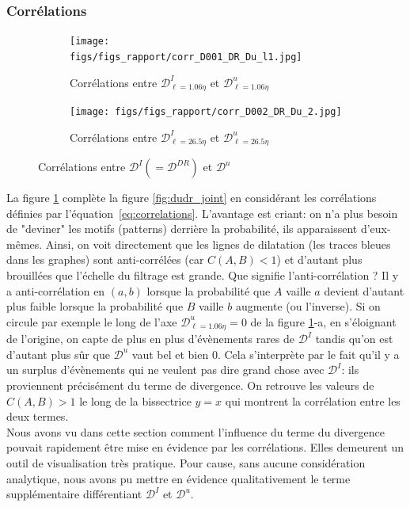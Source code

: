 \documentclass[13pt, a4paper]{extarticle}
\begin{document}
\subsubsection{Corrélations}
\begin{figure}[H]
  \centering
  \begin{subfigure}[b]{0.48\linewidth}
  \centering
  \texttt{[image: figs/figs\_rapport/corr\_D001\_DR\_Du\_l1.jpg]}
  \caption{Corrélations entre $\mathscr{D}^I_{\ell=1.06\eta}$ et $\mathscr{D}^u_{\ell=1.06\eta}$}
  \end{subfigure}
  \begin{subfigure}[b]{0.48\linewidth}
    \centering
    \texttt{[image: figs/figs\_rapport/corr\_D002\_DR\_Du\_2.jpg]}
    \caption{Corrélations entre $\mathscr{D}^I_{\ell=26.5\eta}$ et $\mathscr{D}^u_{\ell=26.5\eta}$}
    \end{subfigure}
  \caption{Corrélations entre $\mathscr{D}^I (=\mathscr{D}^{DR})$ et $\mathscr{D}^u$}
  \label{fig:dudr_correl}
\end{figure}
\noindent La figure \ref{fig:dudr_correl} complète la figure \ref{fig:dudr_joint} 
en considérant les corrélations définies par l'équation~\eqref{eq:correlations}. 
L'avantage est criant: on n'a plus besoin de "deviner" les motifs (patterns) 
derrière la probabilité, ils apparaissent d'eux-mêmes. Ainsi, on voit directement 
que les lignes de dilatation (les traces bleues dans les graphes) sont anti-corrélées 
(car $C(A,B) < 1$) et d'autant plus brouillées que l'échelle du filtrage est grande. 
Que signifie l'anti-corrélation ? Il y a anti-corrélation en $(a,b)$ lorsque la 
probabilité que $A$ vaille $a$ devient d'autant plus faible lorsque la probabilité 
que $B$ vaille $b$ augmente (ou l'inverse). Si on circule par exemple le long de 
l'axe $\mathscr{D}^u_{\ell=1.06\eta}=0$ de la figure \ref{fig:dudr_correl}-a, en 
s'éloignant de l'origine, on capte de plus en plus d'évènements rares de $\mathscr{D}^I$ 
tandis qu'on est d'autant plus sûr que $\mathscr{D}^u$ vaut bel et bien 0. Cela 
s'interprète par le fait qu'il y a un surplus d'évènements qui ne veulent pas dire 
grand chose avec $\mathscr{D}^I$: ils proviennent précisément du terme de divergence. 
On retrouve les valeurs de $C(A,B) > 1$ le long de la bissectrice $y=x$ qui montrent 
la corrélation entre les deux termes.
\\
\noindent Nous avons vu dans cette section comment l'influence du terme du divergence 
pouvait rapidement être mise en évidence par les corrélations. Elles demeurent un outil 
de visualisation très pratique. Pour cause, sans aucune considération analytique, nous 
avons pu mettre en évidence qualitativement le terme supplémentaire différentiant 
$\mathscr{D}^I$ et $\mathscr{D}^u$. 
\end{document}
